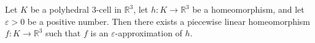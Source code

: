 Let $K$ be a polyhedral $3$-cell in $\mathbb{R}^3$, let $h : K \to \mathbb{R}^3$ be a homeomorphism, and let $\varepsilon > 0$ be a positive number. Then there exists a piecewise linear homeomorphism $f : K \to \mathbb{R}^3$ such that $f$ is an $\varepsilon$-approximation of $h$.
